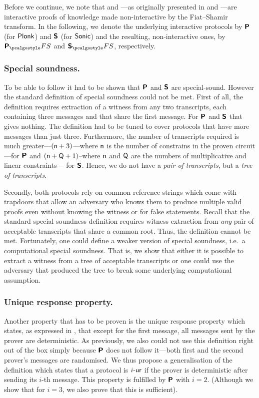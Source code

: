 \let\accentvec\vec \documentclass[runningheads]{llncs}
\begin{document}
Before we continue, we note that \plonk{} and \sonic{}---as originally
presented in \cite{EPRINT:GabWilCio19} and \cite{CCS:MBKM19}---are interactive
proofs of knowledge 
made non-interactive by the Fiat--Shamir transform.  In the following, we denote the underlying
interactive protocols by $\bm{\mathsf{P}}$ (for $\textnormal{\textsf{Plonk}}$) and $\bm{\mathsf{S}}$ (for ${\textnormal{\textsf{Sonic}}}$) and
the resulting, non-interactive ones, by $\plonkprotfs$ and $\sonicprotfs$,
respectively. 

\subsubsection{Special soundness.} 
To be able to follow \cite{INDOCRYPT:FKMV12} it had to be shown that
$\bm{\mathsf{P}}$ and $\bm{\mathsf{S}}$ are special-sound.  However the standard definition of special
soundness could not be met.  First of
all, the  definition requires extraction of a witness from any two
transcripts, each containing three messages and that share the first message. For 
$\bm{\mathsf{P}}$ and $\bm{\mathsf{S}}$ that gives nothing. The definition had to be tuned to cover
protocols that have more messages than just three.  Furthermore, the number of
transcripts required is much greater---$(\mathsf{n} + 3)$---where
$\mathsf{n}$ is the number of constrains in the proven circuit---for
$\bm{\mathsf{P}}$ and $(\mathsf{n} + \mathsf{Q} + 1)$--where $\mathsf{n}$ and
$\mathsf{Q}$ are the numbers of multiplicative and linear constraints---
for $\bm{\mathsf{S}}$. Hence, we do not have a \emph{pair of transcripts}, but a \emph{tree of transcripts}.

Secondly, both protocols rely on common reference strings which come with trapdoors
that allow an adversary who knows them to produce multiple valid proofs even without
knowing the witness or for false statements. Recall that the standard special soundness definition
requires witness extraction from \emph{any} pair of acceptable transcripts
that share a common root. Thus, the definition cannot be met. Fortunately, one
could define a weaker version of special soundness, i.e.~a computational
special soundness. That is, we show that either it is possible to
extract a witness from a tree of acceptable transcripts or one could use the
adversary that produced the tree to break some underlying computational
assumption.

\subsubsection{Unique response property.} Another property that
has to be proven is the unique response property
which states, as expressed in \cite{C:Fischlin05}, that except for the first
message, all messages sent
by the prover are deterministic. As previously, we also could not use this
definition right out of the box simply because $\bm{\mathsf{P}}$ does not follow it---both first
and the second prover's messages are randomised. We thus propose a
generalisation of the definition which states that a protocol is ${i\text{-}\mathsf{ur}}$ if the
prover is deterministic after sending its $i$-th message. This property is
fulfilled by $\bm{\mathsf{P}}$ with $i = 2$. (Although we show that for $i = 3$, we
also prove that this is sufficient).
\end{document}
